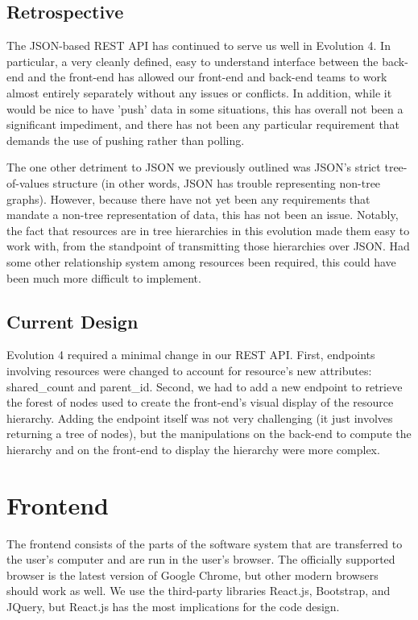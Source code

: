 \documentclass[12pt]{article}
\begin{document}
\subsection{Retrospective}
The JSON-based REST API has continued to serve us well in Evolution 4. In particular, a very cleanly defined, easy to understand interface between the back-end and the front-end has allowed our front-end and back-end teams to work almost entirely separately without any issues or conflicts. In addition, while it would be nice to have 'push' data in some situations, this has overall not been a significant impediment, and there has not been any particular requirement that demands the use of pushing rather than polling. 

The one other detriment to JSON we previously outlined was JSON's strict tree-of-values structure (in other words, JSON has trouble representing non-tree graphs). However, because there have not yet been any requirements that mandate a non-tree representation of data, this has not been an issue. Notably, the fact that resources are in tree hierarchies in this evolution made them easy to work with, from the standpoint of transmitting those hierarchies over JSON. Had some other relationship system among resources been required, this could have been much more difficult to implement. 

\subsection{Current Design}
Evolution 4 required a minimal change in our REST API. First, endpoints involving resources were changed to account for resource's new attributes: shared\_count and parent\_id. Second, we had to add a new endpoint to retrieve the forest of nodes used to create the front-end's visual display of the resource hierarchy. Adding the endpoint itself was not very challenging (it just involves returning a tree of nodes), but the manipulations on the back-end to compute the hierarchy and on the front-end to display the hierarchy were more complex. 


\section{Frontend}
\label{sec:Frontend}
The frontend consists of the parts of the software system that are transferred to the user's computer and are run in the user's browser. The officially supported browser is the latest version of Google Chrome, but other modern browsers should work as well. We use the third-party libraries React.js, Bootstrap, and JQuery, but React.js has the most implications for the code design.
\end{document}

